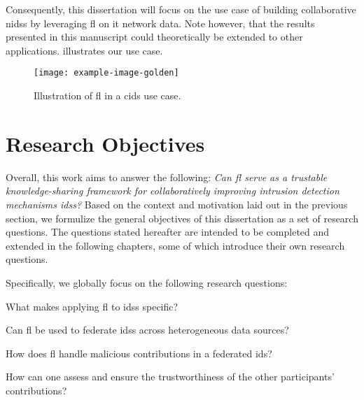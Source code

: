 Consequently, this dissertation will focus on the use case of building collaborative \glspl{nids} by leveraging \gls{fl} on \gls{it} network data.
Note however, that the results presented in this manuscript could theoretically be extended to other applications.
 illustrates our use case.

\begin{figure}
  \centering
  \texttt{[image: example-image-golden]}
  \caption{Illustration of \gls{fl} in a \gls{cids} use case.}
  \label{fig:intro.usecase}
\end{figure}

\section{Research Objectives\label{sec:intro.questions}}

Overall, this work aims to answer the following: \emph{Can \gls{fl} serve as a trustable knowledge-sharing framework for collaboratively improving intrusion detection mechanisms \glspl{ids}?}
Based on the context and motivation laid out in the previous section, we formulize the general objectives of this dissertation as a set of research questions.
The questions stated hereafter are intended to be completed and extended in the following chapters, some of which introduce their own research questions.

Specifically, we globally focus on the following research questions:

\begin{questions}
  \item What makes applying \gls{fl} to \glspl{ids} specific? \label{rq:intro.fids}
  \item Can \gls{fl} be used to federate \glspl{ids} across heterogeneous data sources? \label{rq:intro.heterogeneity}
  \item How does \gls{fl} handle malicious contributions in a federated \gls{ids}? \label{rq:intro.malicious}
  \item How can one assess and ensure the trustworthiness of the other participants' contributions? \label{rq:intro.trust}
\end{questions}


